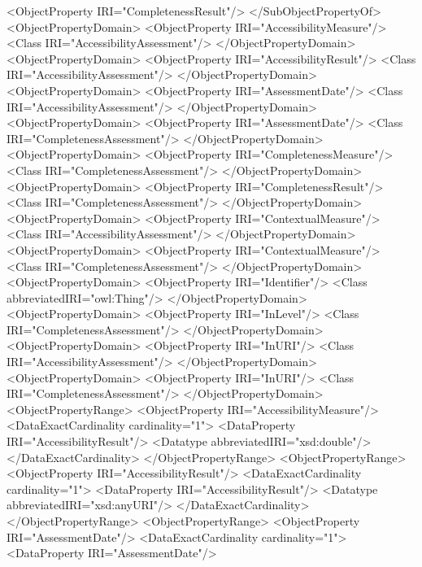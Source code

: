 \begin{listing}
        <ObjectProperty IRI="CompletenessResult"/>
    </SubObjectPropertyOf>
    <ObjectPropertyDomain>
        <ObjectProperty IRI="AccessibilityMeasure"/>
        <Class IRI="AccessibilityAssessment"/>
    </ObjectPropertyDomain>
    <ObjectPropertyDomain>
        <ObjectProperty IRI="AccessibilityResult"/>
        <Class IRI="AccessibilityAssessment"/>
    </ObjectPropertyDomain>
    <ObjectPropertyDomain>
        <ObjectProperty IRI="AssessmentDate"/>
        <Class IRI="AccessibilityAssessment"/>
    </ObjectPropertyDomain>
    <ObjectPropertyDomain>
        <ObjectProperty IRI="AssessmentDate"/>
        <Class IRI="CompletenessAssessment"/>
    </ObjectPropertyDomain>
    <ObjectPropertyDomain>
        <ObjectProperty IRI="CompletenessMeasure"/>
        <Class IRI="CompletenessAssessment"/>
    </ObjectPropertyDomain>
    <ObjectPropertyDomain>
        <ObjectProperty IRI="CompletenessResult"/>
        <Class IRI="CompletenessAssessment"/>
    </ObjectPropertyDomain>
    <ObjectPropertyDomain>
        <ObjectProperty IRI="ContextualMeasure"/>
        <Class IRI="AccessibilityAssessment"/>
    </ObjectPropertyDomain>
    <ObjectPropertyDomain>
        <ObjectProperty IRI="ContextualMeasure"/>
        <Class IRI="CompletenessAssessment"/>
    </ObjectPropertyDomain>
    <ObjectPropertyDomain>
        <ObjectProperty IRI="Identifier"/>
        <Class abbreviatedIRI="owl:Thing"/>
    </ObjectPropertyDomain>
    <ObjectPropertyDomain>
        <ObjectProperty IRI="InLevel"/>
        <Class IRI="CompletenessAssessment"/>
    </ObjectPropertyDomain>
    <ObjectPropertyDomain>
        <ObjectProperty IRI="InURI"/>
        <Class IRI="AccessibilityAssessment"/>
    </ObjectPropertyDomain>
    <ObjectPropertyDomain>
        <ObjectProperty IRI="InURI"/>
        <Class IRI="CompletenessAssessment"/>
    </ObjectPropertyDomain>
    <ObjectPropertyRange>
        <ObjectProperty IRI="AccessibilityMeasure"/>
        <DataExactCardinality cardinality="1">
            <DataProperty IRI="AccessibilityResult"/>
            <Datatype abbreviatedIRI="xsd:double"/>
        </DataExactCardinality>
    </ObjectPropertyRange>
    <ObjectPropertyRange>
        <ObjectProperty IRI="AccessibilityResult"/>
        <DataExactCardinality cardinality="1">
            <DataProperty IRI="AccessibilityResult"/>
            <Datatype abbreviatedIRI="xsd:anyURI"/>
        </DataExactCardinality>
    </ObjectPropertyRange>
    <ObjectPropertyRange>
        <ObjectProperty IRI="AssessmentDate"/>
        <DataExactCardinality cardinality="1">
            <DataProperty IRI="AssessmentDate"/>

\end{listing}
